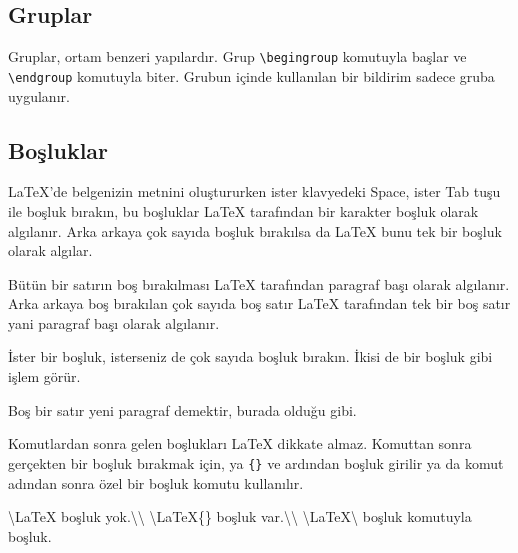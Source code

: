 \documentclass[
  10pt,
]{scrbook}
\newenvironment{Shaded}{\begin{snugshade}}{\end{snugshade}}
\newcommand{\FunctionTok}[1]{\textcolor[rgb]{0.00,0.00,0.00}{#1}}
\newcommand{\NormalTok}[1]{#1}
\theoremstyle{definition}
\theoremstyle{definition}
\theoremstyle{definition}
\theoremstyle{definition}
\theoremstyle{remark}
\begin{document}
\hypertarget{gruplar}{%
\subsection{Gruplar}\label{gruplar}}

Gruplar, ortam benzeri yapılardır. Grup \texttt{\textbackslash{}begingroup} komutuyla başlar ve \texttt{\textbackslash{}endgroup} komutuyla biter. Grubun içinde kullanılan bir bildirim sadece gruba uygulanır.

\hypertarget{bosluk}{%
\subsection{Boşluklar}\label{bosluk}}

LaTeX'de belgenizin metnini oluştururken ister klavyedeki Space, ister Tab tuşu ile boşluk bırakın, bu boşluklar LaTeX tarafından bir karakter boşluk olarak algılanır. Arka arkaya çok sayıda boşluk bırakılsa da LaTeX bunu tek bir boşluk olarak algılar.

Bütün bir satırın boş bırakılması LaTeX tarafından paragraf başı olarak algılanır. Arka arkaya boş bırakılan çok sayıda boş satır LaTeX tarafından tek bir boş satır yani paragraf başı olarak algılanır.

\begin{Shaded}
\begin{Highlighting}[]
\NormalTok{ İster bir boşluk, isterseniz de çok         sayıda boşluk bırakın. }
\NormalTok{İkisi de bir boşluk gibi işlem görür. }

\NormalTok{Boş bir satır yeni paragraf demektir, burada olduğu gibi.}
\end{Highlighting}
\end{Shaded}

Komutlardan sonra gelen boşlukları LaTeX dikkate almaz. Komuttan sonra gerçekten bir boşluk bırakmak için, ya \texttt{\{\}} ve ardından boşluk girilir ya da komut adından sonra özel bir boşluk komutu kullanılır.

\begin{Shaded}
\begin{Highlighting}[]
\FunctionTok{\textbackslash{}LaTeX}\NormalTok{  boşluk yok.}\FunctionTok{\textbackslash{}\textbackslash{}}
\FunctionTok{\textbackslash{}LaTeX}\NormalTok{\{\} boşluk var.}\FunctionTok{\textbackslash{}\textbackslash{}}
\FunctionTok{\textbackslash{}LaTeX\textbackslash{} }\NormalTok{boşluk komutuyla  boşluk.}
\end{Highlighting}
\end{Shaded}
\end{document}
